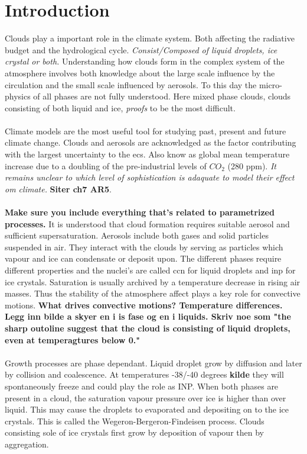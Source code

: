 \chapter{Introduction} \label{ch:introduction}
Clouds play a important role in the climate system. Both affecting the radiative budget and the hydrological cycle. \textit{Consist/Composed of liquid droplets, ice crystal or both.} Understanding how clouds form in the complex system of the atmosphere involves both knowledge about the large scale influence by the circulation and the small scale influenced by aerosols. To this day the micro-physics of all phases are not fully understood. Here mixed phase clouds, clouds consisting of both liquid and ice, \textit{proofs} to be the most difficult. 
\\ \\ 
Climate models are the most useful tool for studying past, present and future climate change. Clouds and aerosols are acknowledged as the factor contributing with the largest uncertainty to the \acrfull{ecs}. Also know as global mean temperature increase due to a doubling of the pre-industrial levels of $CO_2$ (280 \acrshort{ppm}). \textit{It remains unclear to which level of sophistication is adaquate to model their effect om climate.} \textbf{Siter ch7 AR5}.
\\ \\
\textbf{Make sure you include everything that's related to parametrized processes.} It is understood that cloud formation requires suitable aerosol and sufficient supersaturation. Aerosols include both gases and solid particles suspended in air. They interact with the clouds by serving as particles which vapour and ice can condensate or deposit upon. The different phases require different properties and the nuclei's are called \acrshort{ccn} for liquid droplets and \acrshort{inp} for ice crystals. Saturation is usually archived by a temperature decrease in rising air masses. Thus the stability of the atmosphere affect plays a key role for convective motions. \textbf{What drives convective motions? Temperature differences.}
\textbf{Legg inn bilde a skyer en i is fase og en i liquids. Skriv noe som "the sharp outoline suggest that the cloud is consisting of liquid droplets, even at temperagtures below 0."}
\\ \\ 
Growth processes are phase dependant. Liquid droplet grow by diffusion and later by collision and coalescence. At temperatures -38/-40 degrees \textbf{kilde} they will spontaneously freeze and could play the role as INP. When both phases are present in a cloud, the saturation vapour pressure over ice is higher than over liquid. This may cause the droplets to evaporated and depositing on to the ice crystals. This is called the Wegeron-Bergeron-Findeisen process. Clouds consisting sole of ice crystals first grow by deposition of vapour then by aggregation. 
